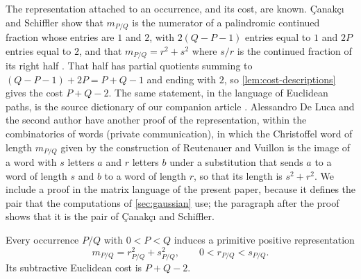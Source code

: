The representation attached to an occurrence, and its cost, are known.
\c{C}anak\c{c}{\i} and Schiffler show that $m_{P/Q}$ is the numerator of a
palindromic continued fraction whose entries are $1$ and $2$, with
$2(Q-P-1)$ entries equal to $1$ and $2P$ entries equal to $2$, and that
$m_{P/Q}=r^2+s^2$ where $s/r$ is the continued fraction of its right half
\cite[Section~4.1, Theorem~4.1 and the proof of Corollary~4.4]{CanakciSchiffler2020}.
That half has partial quotients summing to $(Q-P-1)+2P=P+Q-1$ and ending
with $2$, so \cref{lem:cost-descriptions} gives the cost $P+Q-2$. The same statement, in the language of Euclidean paths, is the
source dictionary of our companion article \cite{DutykhVuillon2026Endpoint}.
Alessandro De Luca and the second author have another proof of the
representation, within the combinatorics of words (private communication), in
which the Christoffel word of length $m_{P/Q}$ given by the construction of
Reutenauer and Vuillon \cite{ReutenauerVuillon2017} is the image of a word with
$s$ letters $a$ and $r$ letters $b$ under a substitution that sends $a$ to a
word of length $s$ and $b$ to a word of length $r$, so that its length is
$s^2+r^2$.
We include a proof in the matrix language of the present paper, because it
defines the pair that the computations of \cref{sec:gaussian} use; the
paragraph after the proof shows that it is the pair of \c{C}anak\c{c}{\i} and
Schiffler.

\begin{proposition}\label{prop:occurrence-cost}
Every occurrence $P/Q$ with $0<P<Q$ induces a primitive positive
representation
$$
 m_{P/Q}=r_{P/Q}^2+s_{P/Q}^2,\qquad 0<r_{P/Q}<s_{P/Q}.
$$
Its subtractive Euclidean cost is $P+Q-2$.
\end{proposition}

